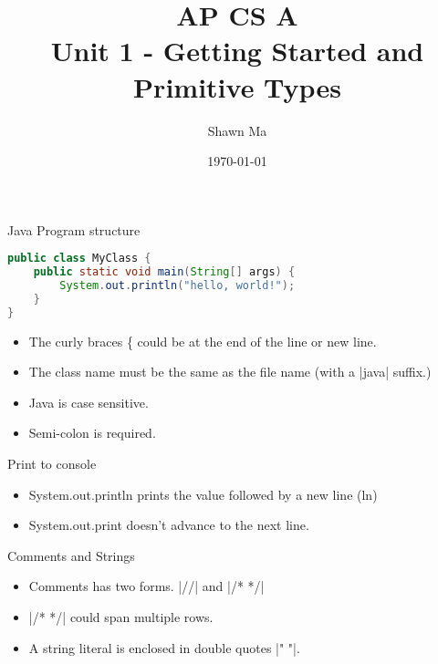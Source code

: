 \documentclass[aspectratio=169]{beamer}
\title{AP CS A\\Unit 1 - Getting Started and Primitive Types}
\date{\today}
\author{Shawn Ma}
\renewcommand{\verb}{\collectverb{\color{codegreen}}}
\begin{document}
    \maketitle
    \begin{frame}[fragile]{Java Program structure}
   
    \begin{lstlisting}[language=Java]
public class MyClass {
    public static void main(String[] args) {
        System.out.println("hello, world!");
    }
}
        \end{lstlisting}
    \begin{itemize}
        \item The curly braces \alert{\{} could be at the end of the line or new line.
        \item The class name must be the same as the file name (with a \verb|java| suffix.)
        \item Java is case sensitive.
        \item Semi-colon is required.
    \end{itemize}

\end{frame}
\begin{frame}{Print to console}
\begin{itemize}
    \item \alert{System.out.println} prints the value followed by a new line (ln)
    \item \alert{System.out.print} doesn't advance to the next line.

\end{itemize}
\end{frame}

\begin{frame}[fragile]{Comments and Strings}
\begin{itemize}
    \item \alert{Comments} has two forms. \verb|//| and \verb|/* */|
    \item \verb|/* */| could span multiple rows.
    \item A string literal is enclosed in double quotes \verb|" "|.
\end{itemize}
\end{frame}
\end{document}
